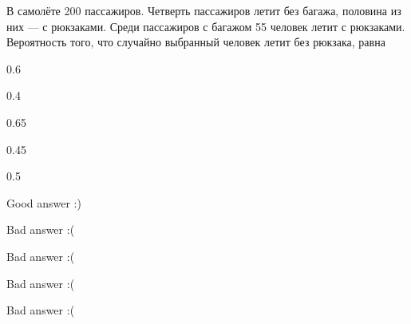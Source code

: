 
\begin{question}
В самолёте 200 пассажиров. Четверть пассажиров летит без багажа,
половина из них — с рюкзаками. Среди пассажиров с багажом 55 человек
летит с рюкзаками. Вероятность того, что случайно выбранный человек
летит без рюкзака, равна
\begin{answerlist}
  \item 0.6
  \item 0.4
  \item 0.65
  \item 0.45
  \item 0.5
\end{answerlist}
\end{question}

\begin{solution}
\begin{answerlist}
  \item Good answer :)
  \item Bad answer :(
  \item Bad answer :(
  \item Bad answer :(
  \item Bad answer :(
\end{answerlist}
\end{solution}

